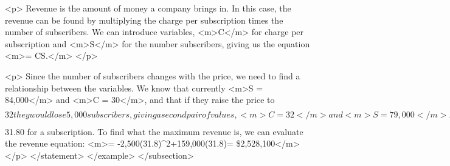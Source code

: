                 <p>
                    Revenue is the amount of money a company brings in.
                    In this case, the revenue can be found by multiplying the charge per subscription times the number of subscribers.
                    We can introduce variables, <m>C</m> for charge per subscription and <m>S</m> for the number subscribers, giving us the equation <m>= CS.</m>
                </p>

                <p>
                    Since the number of subscribers changes with the price, we need to find a relationship between the variables.
                    We know that currently <m>S = 84,000</m> and <m>C = 30</m>, and that if they raise the price to $32 they would lose 5,000 subscribers, giving a second pair of values, <m>C = 32</m> and <m>S = 79,000</m>.
                    From this we can find a linear equation relating the two quantities.
                    Treating <m>C</m> as the input and <m>S</m> as the output, the equation will have form <m>S=mC+b</m>.
                    The slope will be <m>m=\dfrac{79,000-84,000}{32-30}=\dfrac{-5,000}{2}=-2,500.</m>
                </p>

                <p>
                    This tells us the paper will lose 2,500 subscribers for each dollar they raise the price.
                    We can then solve for the vertical intercept.
                    Starting with what we know: <m>S=-2500C+b.</m> Plugging in the point <m>S = 84,000</m> and <m>C = 30</m> gets us <m>84,000=-2500(30)+b.</m> Solving this for <m>b</m> gets <m>b=159,000.</m>
                </p>

                <p>
                    This gives us the linear equation <m>S=-2,500C+159,000</m> relating cost and subscribers.
                    We now return to our revenue equation.
                    Since <m>\text{Revenue}=CS,</m> we substitute the equation for <m>S</m> from above to get <m>\text{Revenue}=C(-2,500C+159,000).</m> Expanding this equation gives <m>\text{Revenue}=-2,500C^{2}+159,000C.</m>
                </p>

                <p>
                    We now have a quadratic equation for revenue as a function of the subscription charge.
                    To find the price that will maximize revenue for the newspaper, we can find the vertex: <m>h=\dfrac{-159,000}{2(-2,500)}=31.8</m>
                </p>

                <p>
                    The model tells us that the maximum revenue will occur if the newspaper charges $31.80 for a subscription.
                    To find what the maximum revenue is, we can evaluate the revenue equation: <m>= -2,500(31.8)^{2}+159,000(31.8)= \$2,528,100</m>
                </p>
            </statement>
        </example>
    </subsection>


